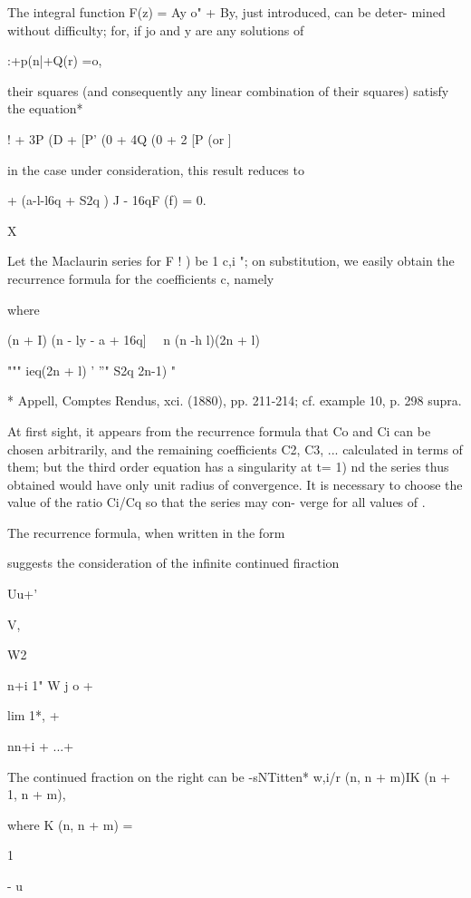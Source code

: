 
The integral function F(z) = Ay o" + By, just introduced, can be
deter- mined without difficulty; for, if jo and y are any solutions
of

 :+p(n|+Q(r) =o,

their squares (and consequently any linear combination of their
squares) satisfy the equation*

 ! + 3P (D + [P' (0 + 4Q (0 + 2 [P (or ]

in the case under consideration, this result reduces to

+ (a-l-l6q + S2q ) J - 16qF (f) = 0.

X

Let the Maclaurin series for F ! ) be 1 c,i "; on substitution, we
easily obtain the recurrence formula for the coefficients c, namely

where

(n + I) (n - ly - a + 16q] \ \ n (n -h l)(2n + l)

""" ieq(2n + l) ' ''" S2q 2n-1) "

* Appell, Comptes Rendus, xci. (1880), pp. 211-214; cf. example 10,
p. 298 supra.

%
%

At first sight, it appears from the recurrence formula that Co and Ci
can be chosen arbitrarily, and the remaining coefficients C2, C3, ...
calculated in terms of them; but the third order equation has a
singularity at t= 1) nd the series thus obtained would have only unit
radius of convergence. It is necessary to choose the value of the
ratio Ci/Cq so that the series may con- verge for all values of .

The recurrence formula, when written in the form

suggests the consideration of the infinite continued firaction

Uu+'

V,

W2

n+i 1" W j o +  

lim 1*, +

nn+i + ...+

The continued fraction on the right can be -sNTitten* w,i/r (n, n +
m)IK (n + 1, n + m),

where K (n, n + m) =

1

- u

